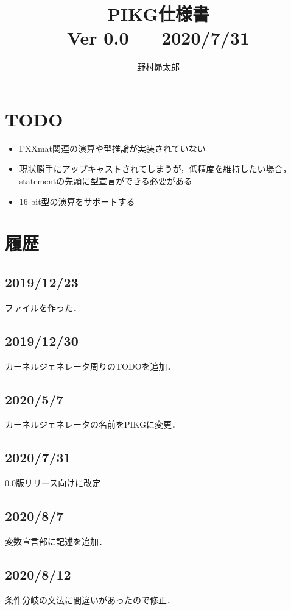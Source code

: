 \documentclass{article}
\begin{document}
%
\title{PIKG仕様書\\
{\large 
Ver 0.0 --- 2020/7/31\\
}
}
\author{野村昴太郎}
\maketitle
\thispagestyle{empty}

\newpage
\tableofcontents
\newpage

\section{TODO}
 \begin{itemize}
  \item FXXmat関連の演算や型推論が実装されていない
  \item 現状勝手にアップキャストされてしまうが，低精度を維持したい場合，statementの先頭に型宣言ができる必要がある
  \item 16 bit型の演算をサポートする
 \end{itemize}
\section{履歴}
\label{sect:4}
\subsection{2019/12/23}
ファイルを作った．
\subsection{2019/12/30}
カーネルジェネレータ周りのTODOを追加．
\subsection{2020/5/7}
カーネルジェネレータの名前をPIKGに変更．
\subsection{2020/7/31}
0.0版リリース向けに改定
\subsection{2020/8/7}
変数宣言部に記述を追加．
\subsection{2020/8/12}
条件分岐の文法に間違いがあったので修正．
\end{document}
